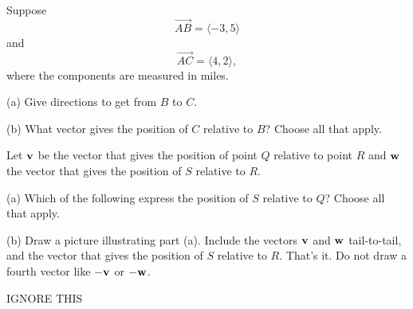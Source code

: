 \documentclass{ximera}
\begin{document}
\begin{question}  \label{Qsdfsdt4r3:Vectors}
Suppose
\[
 \overrightarrow{AB} = \langle  -3,5 \rangle
\]
and
\[
   \overrightarrow{AC} = \langle  4,2 \rangle ,
\]
where the components are measured in miles.

(a) Give directions to get from $B$ to $C$.

(b) What vector gives the position of $C$ relative to $B$? Choose all that apply.
\begin{selectAll} 
\end{selectAll} 

\end{question}





\begin{question}  \label{Q234r3:Vectors}
Let ${\bf v}$ be the vector that gives the position of point $Q$ relative to point $R$ and ${\bf w}$ the vector that gives the position of $S$ relative to $R$. 

(a) Which of the following express the position of $S$ relative to $Q$? Choose all that apply.

\begin{selectAll}  
\end{selectAll}

(b) Draw a picture illustrating part (a). Include the vectors ${\bf v}$ and ${\bf w}$ tail-to-tail, and the vector that gives the position of $S$ relative to $R$. That's it. Do not draw a fourth vector like $-{\bf v}$ or $-{\bf w}$.


\end{question}



IGNORE THIS

 
\begin{onlineOnly}
    \begin{center}
\end{center}
\end{onlineOnly}
\end{document}

